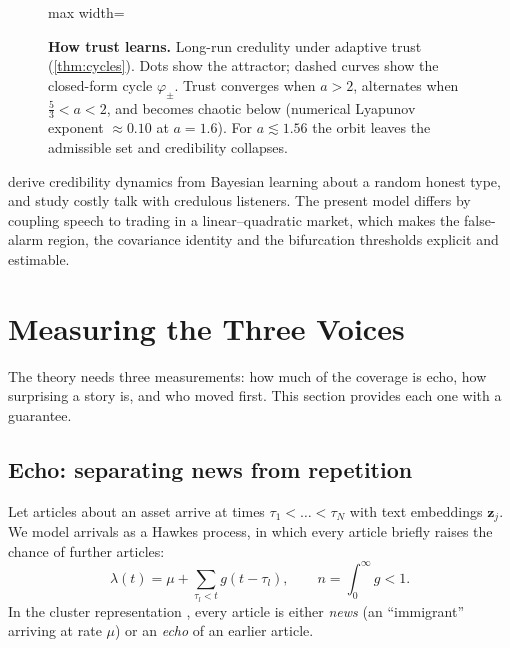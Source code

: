 \documentclass[11pt,a4paper]{article}
\theoremstyle{sci}
\theoremstyle{scidef}
\newcommand{\z}{\bm{z}}
\begin{document}
\begin{figure}[t]
\begin{adjustbox}{max width=\linewidth}
\end{adjustbox}
\caption{\textbf{How trust learns.} Long-run credulity under adaptive trust (\cref{thm:cycles}). Dots show the attractor; dashed curves show the closed-form cycle $\varphi_\pm$. Trust converges when $a>2$, alternates when $\tfrac53<a<2$, and becomes chaotic below (numerical Lyapunov exponent $\approx0.10$ at $a=1.6$). For $a\lesssim1.56$ the orbit leaves the admissible set and credibility collapses.}
\label{fig:bifurcation}
\end{figure}

\citet{benabou1992} derive credibility dynamics from Bayesian learning about a random honest type, and \citet{kartik2007} study costly talk with credulous listeners. The present model differs by coupling speech to trading in a linear--quadratic market, which makes the false-alarm region, the covariance identity and the bifurcation thresholds explicit and estimable.

\section{Measuring the Three Voices}\label{sec:measure}

The theory needs three measurements: how much of the coverage is echo, how surprising a story is, and who moved first. This section provides each one with a guarantee.

\subsection{Echo: separating news from repetition}\label{sec:echo}

Let articles about an asset arrive at times $\tau_1<\dots<\tau_N$ with text embeddings $\z_j$. We model arrivals as a Hawkes process, in which every article briefly raises the chance of further articles:
\[
  \lambda(t)=\mu+\sum_{\tau_l<t}g(t-\tau_l),\qquad n=\int_0^\infty g<1 .
\]
In the cluster representation \citep{hawkesoakes1974}, every article is either \emph{news} (an ``immigrant'' arriving at rate $\mu$) or an \emph{echo} of an earlier article.
\end{document}
